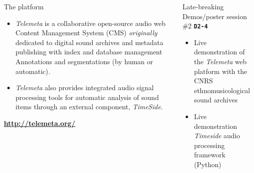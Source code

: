 \documentclass[final, hyperref, table]{beamer}
\begin{document}
\begin{frame}
\begin{columns}
\column[t]{5.7cm}
\begin{block}{The platform}
  \begin{itemize}
  \item \emph{Telemeta} is a collaborative \alert{open-source audio web Content
      Management System} (CMS) \emph{originally} dedicated to \alert{digital sound archives} and metadata publishing with index and database management
     \alert{Annotations and segmentations} (by human or automatic).
  \item \emph{Telemeta} also provides integrated \alert{audio signal
      processing tools} for automatic analysis of sound items through an external component, \emph{TimeSide}.
  \end{itemize}
\vspace{-0.5cm}
    \begin{center}
      \colorbox{yellow!50}{\textbf{\url{http://telemeta.org/}}}
    \end{center}
  \end{block}
 
  \begin{block}{Late-breaking Demos/poster session \#2 \texttt{\textbf{D2-4}}}
    \begin{itemize}
       \item Live demonstration of the \emph{Telemeta} web platform with
      the CNRS \alert{ethnomusicological sound archives}
    \item Live demonstration \emph{Timeside} audio processing framework (Python)
    \end{itemize}
  \end{block}

\end{columns}
\end{frame}
\end{document}
